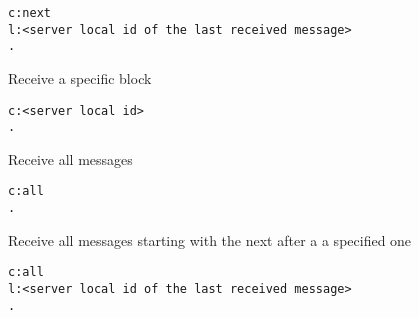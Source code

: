 \documentclass[twoside,a4paper,english,12pt,authoryear,openright]{book}
\begin{document}
\begin{lstlisting}
c:next
l:<server local id of the last received message>
.
\end{lstlisting}

Receive a specific block

\begin{lstlisting}
c:<server local id>
.
\end{lstlisting}

Receive all messages

\begin{lstlisting}
c:all
.
\end{lstlisting}

Receive all messages starting with the next after a a specified one

\begin{lstlisting}
c:all
l:<server local id of the last received message>
.
\end{lstlisting}


\backmatter 
 

% 

\end{document}
